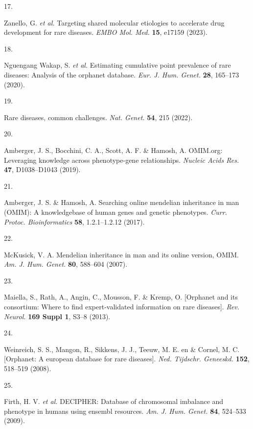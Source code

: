 \documentclass[
]{agujournal2019}
\newlength{\cslhangindent}
\newlength{\csllabelwidth}
\newenvironment{CSLReferences}[2] %
 {\begin{list}{}{%
  \setlength{\itemindent}{0pt}
  \setlength{\leftmargin}{0pt}
  \setlength{\parsep}{0pt}
  \ifodd #1
   \setlength{\leftmargin}{\cslhangindent}
   \setlength{\itemindent}{-1\cslhangindent}
  \fi
  \setlength{\itemsep}{#2\baselineskip}}}
 {\end{list}}
\newcommand{\CSLLeftMargin}[1]{\parbox[t]{\csllabelwidth}{\strut#1\strut}}
\newcommand{\CSLRightInline}[1]{\parbox[t]{\linewidth - \csllabelwidth}{\strut#1\strut}}
\begin{document}
\begin{CSLReferences}{0}{0}
\CSLLeftMargin{17. }%
\CSLRightInline{Zanello, G. \emph{et al.} Targeting shared molecular
etiologies to accelerate drug development for rare diseases. \emph{EMBO
Mol. Med.} \textbf{15}, e17159 (2023).}

\CSLLeftMargin{18. }%
\CSLRightInline{Nguengang Wakap, S. \emph{et al.} Estimating cumulative
point prevalence of rare diseases: Analysis of the orphanet database.
\emph{Eur. J. Hum. Genet.} \textbf{28}, 165--173 (2020).}

\CSLLeftMargin{19. }%
\CSLRightInline{Rare diseases, common challenges. \emph{Nat. Genet.}
\textbf{54}, 215 (2022).}

\CSLLeftMargin{20. }%
\CSLRightInline{Amberger, J. S., Bocchini, C. A., Scott, A. F. \&
Hamosh, A. {OMIM.org}: Leveraging knowledge across phenotype-gene
relationships. \emph{Nucleic Acids Res.} \textbf{47}, D1038--D1043
(2019).}

\CSLLeftMargin{21. }%
\CSLRightInline{Amberger, J. S. \& Hamosh, A. Searching online mendelian
inheritance in man ({OMIM)}: A knowledgebase of human genes and genetic
phenotypes. \emph{Curr. Protoc. Bioinformatics} \textbf{58},
1.2.1--1.2.12 (2017).}

\CSLLeftMargin{22. }%
\CSLRightInline{McKusick, V. A. Mendelian inheritance in man and its
online version, {OMIM}. \emph{Am. J. Hum. Genet.} \textbf{80}, 588--604
(2007).}

\CSLLeftMargin{23. }%
\CSLRightInline{Maiella, S., Rath, A., Angin, C., Mousson, F. \& Kremp,
O. {[}Orphanet and its consortium: Where to find expert-validated
information on rare diseases{]}. \emph{Rev. Neurol.} \textbf{169 Suppl
1}, S3--8 (2013).}

\CSLLeftMargin{24. }%
\CSLRightInline{Weinreich, S. S., Mangon, R., Sikkens, J. J., Teeuw, M.
E. en \& Cornel, M. C. {[}Orphanet: A european database for rare
diseases{]}. \emph{Ned. Tijdschr. Geneeskd.} \textbf{152}, 518--519
(2008).}

\CSLLeftMargin{25. }%
\CSLRightInline{Firth, H. V. \emph{et al.} {DECIPHER}: Database of
chromosomal imbalance and phenotype in humans using ensembl resources.
\emph{Am. J. Hum. Genet.} \textbf{84}, 524--533 (2009).}


\end{CSLReferences}
\end{document}

